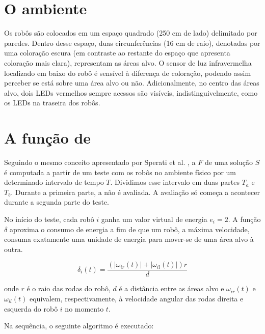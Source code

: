 \section{O ambiente}
\label{sec:environment}

Os robôs são colocados em um espaço quadrado (250 cm de lado) delimitado por paredes. Dentro desse espaço, duas circunferências (16 cm de raio), denotadas por uma coloração escura (em contraste ao restante do espaço que apresenta coloração mais clara), representam as áreas alvo. O sensor de luz infravermelha localizado em baixo do robô é sensível à diferença de coloração, podendo assim perceber se está sobre uma área alvo ou não. Adicionalmente, no centro das áreas alvo, dois LEDs vermelhos sempre acessos são visíveis, indistinguivelmente, como os LEDs na traseira dos robôs.

\section{A função de \fitness}
\label{sec:fitness}

Seguindo o mesmo conceito apresentado por Sperati et al. \cite{sperati2011path}, a \fitness $F$ de uma solução $S$ é computada a partir de um teste com os robôs no ambiente físico por um determinado intervalo de tempo $T$. Dividimos esse intervalo em duas partes $T_{a}$ e $T_{b}$. Durante a primeira parte, a \fitness não é avaliada. A avaliação só começa a acontecer durante a segunda parte do teste.

No início do teste, cada robô $i$ ganha um valor virtual de energia $e_{i} = 2$. A função $\delta$ aproxima o consumo de energia a fim de que um robô, a máxima velocidade, consuma exatamente uma unidade de energia para mover-se de uma área alvo à outra.

$$
\delta_{i} (t) = \frac{( | \omega_{ir} (t) | + | \omega_{il} (t) |) r}{d}
$$

onde $r$ é o raio das rodas do robô, $d$ é a distância entre as áreas alvo e $\omega_{ir} (t)$ e $\omega_{il} (t)$ equivalem, respectivamente, à velocidade angular das rodas direita e esquerda do robô $i$ no momento $t$.

Na sequência, o seguinte algoritmo é executado:

